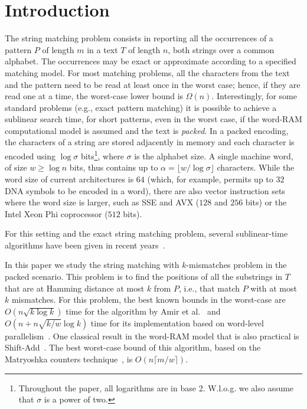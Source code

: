 \documentclass{llncs}
\newcommand{\ceil}[1]{\lceil #1 \rceil}
\newcommand{\floor}[1]{\lfloor #1 \rfloor}
\begin{document}
\section{Introduction}
\noindent
The string matching problem consists in reporting all the occurrences
of a pattern $P$ of length $m$ in a text $T$ of length $n$, both strings over a common alphabet. The
occurrences may be exact or approximate according to a specified
matching model.
For most matching problems, all the characters from the text and the
pattern need to be read at least once in the worst case; hence, if
they are read one at a time, the worst-case lower bound is
$\Omega(n)$.
Interestingly, for some standard problems (e.g., exact pattern
matching) it is possible to achieve a sublinear search time, for short
patterns, even in the worst case, if the word-RAM computational model
is assumed and the text is {\em packed}. In a packed encoding, the
characters of a string are stored adjacently in memory and each
character is encoded using $\log\sigma$
bits\footnote{Throughout the paper, all logarithms are in base 2.
  W.l.o.g. we also assume that $\sigma$ is a power of two.}, where
$\sigma$ is the alphabet size. A single machine word, of size $w \geq
\log n$ bits, thus contains up to $\alpha = \floor{w / \log\sigma}$
characters.
While the word size of current architectures is $64$ (which, for
example, permits up to $32$ DNA symbols to be encoded in a word), there are also
vector instruction sets where the word size is larger, such as SSE and
AVX ($128$ and $256$ bits) or the Intel Xeon Phi coprocessor ($512$
bits).


For this setting and the exact string matching problem, several
sublinear-time algorithms have been given in recent
years~\cite{Fredriksson2002,Bille2011,Belazzougui2012jda,Ben-KikiBBGGW2011,BreslauerGG2012}.

In this paper we study the string matching with $k$-mismatches problem
in the packed scenario. This problem is to find
the positions of all the substrings in $T$ that are at Hamming
distance at most $k$ from $P$, i.e., that match $P$ with at most $k$
mismatches. For this problem, the best known bounds in the worst-case
are $O(n\sqrt{k\log k})$ time for the algorithm by Amir et
al.~\cite{DBLP:journals/jal/AmirLP04} and $O(n + n\sqrt{k/w}\log k)$
time for its implementation based on word-level
parallelism~\cite{DBLP:journals/ejc/FredrikssonG13}. One classical
result in the word-RAM model that is also practical is Shift-Add~\cite{DBLP:journals/cacm/Baeza-YatesG92}.
The best worst-case bound of this algorithm, based on the Matryoshka counters
technique~\cite{DBLP:journals/ipl/GrabowskiF08}, is $O(n\ceil{m/w})$.
\end{document}
